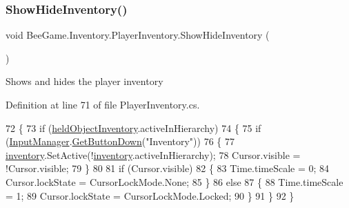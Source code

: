 \subsubsection{\texorpdfstring{Show\+Hide\+Inventory()}{ShowHideInventory()}}
{\footnotesize\ttfamily void Bee\+Game.\+Inventory.\+Player\+Inventory.\+Show\+Hide\+Inventory (\begin{DoxyParamCaption}{ }\end{DoxyParamCaption})\hspace{0.3cm}{\ttfamily [private]}}



Shows and hides the player inventory 



Definition at line 71 of file Player\+Inventory.\+cs.


\begin{DoxyCode}
72         \{
73             \textcolor{keywordflow}{if} (\hyperlink{class_bee_game_1_1_inventory_1_1_player_inventory_a595e1144315e0e9be0b825b538643e1f}{heldObjectInventory}.activeInHierarchy)
74             \{
75                 \textcolor{keywordflow}{if} (\hyperlink{class_bee_game_1_1_core_1_1_input_manager}{InputManager}.\hyperlink{class_bee_game_1_1_core_1_1_input_manager_ac90aab89652007118b67f60e962103c5}{GetButtonDown}(\textcolor{stringliteral}{"Inventory"}))
76                 \{
77                     \hyperlink{class_bee_game_1_1_inventory_1_1_player_inventory_a102e6767793ea61ae62dce5840fd405b}{inventory}.SetActive(!\hyperlink{class_bee_game_1_1_inventory_1_1_player_inventory_a102e6767793ea61ae62dce5840fd405b}{inventory}.activeInHierarchy);
78                     Cursor.visible = !Cursor.visible;
79                 \}
80 
81                 \textcolor{keywordflow}{if} (Cursor.visible)
82                 \{
83                     Time.timeScale = 0;
84                     Cursor.lockState = CursorLockMode.None;
85                 \}
86                 \textcolor{keywordflow}{else}
87                 \{
88                     Time.timeScale = 1;
89                     Cursor.lockState = CursorLockMode.Locked;
90                 \}
91             \}
92         \}
\end{DoxyCode}
\mbox{\label{class_bee_game_1_1_inventory_1_1_player_inventory_a0e00b423e304507a227ed84df2b6039c}} 
